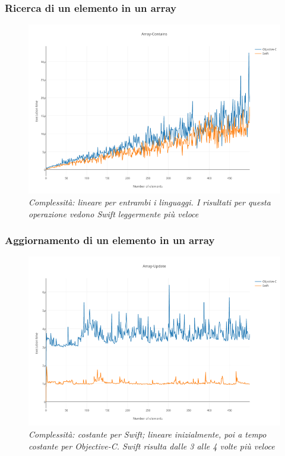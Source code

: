 \subsubsection{Ricerca di un elemento in un array}
\begin{figure}[H]
      \centering
      \includegraphics[scale=0.50]{immagini/array_contains.png}
            \vspace{0.8cm}
            \caption{\textit{Complessità: lineare per entrambi i linguaggi. I risultati per questa operazione vedono Swift leggermente più veloce}}
\end{figure}
\subsubsection{Aggiornamento di un elemento in un array}
\begin{figure}[H]
      \centering
      \includegraphics[scale=0.50]{immagini/array_update.png}
            \vspace{0.8cm}
            \caption{\textit{Complessità: costante per Swift; lineare inizialmente, poi a tempo costante per Objective-C. Swift risulta dalle 3 alle 4 volte più veloce}}
\end{figure}
